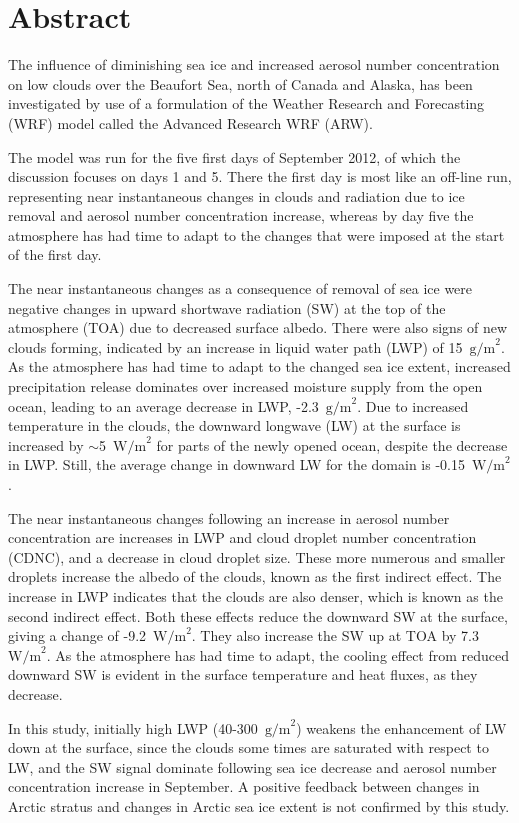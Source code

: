 \chapter*{Abstract}
The influence of diminishing sea ice and increased aerosol number concentration on low clouds over the Beaufort Sea, north of Canada and Alaska, has been investigated by use of a formulation of the Weather Research and Forecasting (WRF) model called the Advanced Research WRF (ARW).

The model was run for the five first days of September 2012, of which the discussion focuses on days 1 and 5. There the first day is most like an off-line run, representing near instantaneous changes in clouds and radiation due to ice removal and aerosol number concentration increase, whereas by day five the atmosphere has had time to adapt to the changes that were imposed at the start of the first day.

The near instantaneous changes as a consequence of removal of sea ice were negative changes in upward shortwave radiation (SW) at the top of the atmosphere (TOA) due to decreased surface albedo. There were also signs of new clouds forming, indicated by an increase in liquid water path (LWP) of 15~$\text{g/m}^2$. As the atmosphere has had time to adapt to the changed sea ice extent, increased precipitation release dominates over increased moisture supply from the open ocean, leading to an average decrease in LWP, -2.3~$\text{g/m}^2$. Due to increased temperature in the clouds, the downward longwave (LW) at the surface is increased by $\sim$5~$\text{W/m}^2$ for parts of the newly opened ocean, despite the decrease in LWP. Still, the average change in downward LW for the domain is -0.15~$\text{W/m}^2$.

The near instantaneous changes following an increase in aerosol number concentration are increases in LWP and cloud droplet number concentration (CDNC), and a decrease in cloud droplet size. These more numerous and smaller droplets increase the albedo of the clouds, known as the first indirect effect. The increase in LWP indicates that the clouds are also denser, which is known as the second indirect effect. Both these effects reduce the downward SW at the surface, giving a change of -9.2~$\text{W/m}^2$. They also increase the SW up at TOA by 7.3~$\text{W/m}^2$. As the atmosphere has had time to adapt, the cooling effect from reduced downward SW is evident in the surface temperature and heat fluxes, as they decrease.

In this study, initially high LWP (40-300~$\text{g/m}^2$) weakens the enhancement of LW down at the surface, since the clouds some times are saturated with respect to LW, and the SW signal dominate following sea ice decrease and aerosol number concentration increase in September. A positive feedback between changes in Arctic stratus and changes in Arctic sea ice extent is not confirmed by this study.